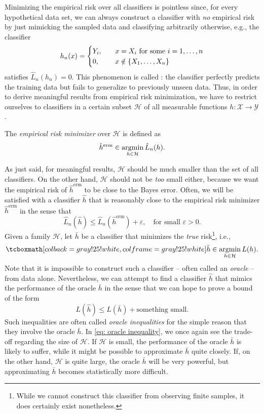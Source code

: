 Minimizing the empirical risk over all classifiers is pointless since, for every hypothetical data set, we can always construct a classifier with \emph{no} empirical risk by just mimicking the sampled data and classifying arbitrarily otherwise, e.g., the classifier
\[
    h_n(x) = \begin{cases}
        Y_i, \quad & x = X_i \text{ for some } i = 1, \dots, n \\
        0, \quad & x \notin \set{X_1, \dots, X_n}
    \end{cases}
\]
satisfies $\hat{L}_n(h_n) = 0$. This phenomenon is called : the classifier perfectly predicts the training data but fails to generalize to previously unseen data. Thus, in order to derive meaningful results from empirical risk minimization, we have to restrict ourselves to classifiers in a certain subset $\mathcal{H}$ of all measurable functions $h \colon \mathcal{X} \to \mathcal{Y}$.

\begin{definition}
The \emph{empirical risk minimizer} over $\mathcal{H}$ is defined as
\[
    \hat{h}^{\text{erm}} \in \operatorname*{argmin}_{h \in \mathcal{H}} \hat{L}_n(h).
\]
\end{definition}

As just said, for meaningful results, $\mathcal{H}$ should be much smaller than the set of all classifiers. On the other hand, $\mathcal{H}$ should not be \emph{too} small either, because we want the empirical risk of $\hat{h}^{\text{erm}}$ to be close to the Bayes error. Often, we will be satisfied with a classifier $\hat{h}$ that is reasonably close to the empirical risk minimizer $\hat{h}^{\text{erm}}$ in the sense that
\[
    \hat{L}_n(\hat{h}) \leq \hat{L}_n(\hat{h}^{\text{erm}}) + \varepsilon, \quad \text{for small } \varepsilon > 0.
\]
Given a family $\mathcal{H}$, let $\bar{h}$ be a classifier that minimizes the \emph{true} risk\footnote{While we cannot construct this classifier from observing finite samples, it does certainly exist nonetheless.}, i.e.,
\[
    \highlightMath{
        \bar{h} \in \argmin_{h\in \mathcal{H}} L(h).
    }
\]
Note that it is impossible to construct such a classifier -- often called an \emph{oracle} -- from data alone. Nevertheless, we can attempt to find a classifier $\hat{h}$ that mimics the performance of the oracle $\bar{h}$ in the sense that we can hope to prove a bound of the form
\begin{equation}
    \label{eq: oracle inequality}
    L(\hat{h}) \leq L(\bar{h}) + \text{something small}.
\end{equation}
Such inequalities are often called \emph{oracle inequalities} for the simple reason that they involve the oracle $\bar{h}$. In \eqref{eq: oracle inequality}, we once again see the trade-off regarding the size of $\mathcal{H}$. If $\mathcal{H}$ is small, the performance of the oracle $\bar{h}$ is likely to suffer, while it might be possible to approximate $\bar{h}$ quite closely. If, on the other hand, $\mathcal{H}$ is quite large, the oracle $\bar{h}$ will be very powerful, but approximating $\bar{h}$ becomes statistically more difficult.

